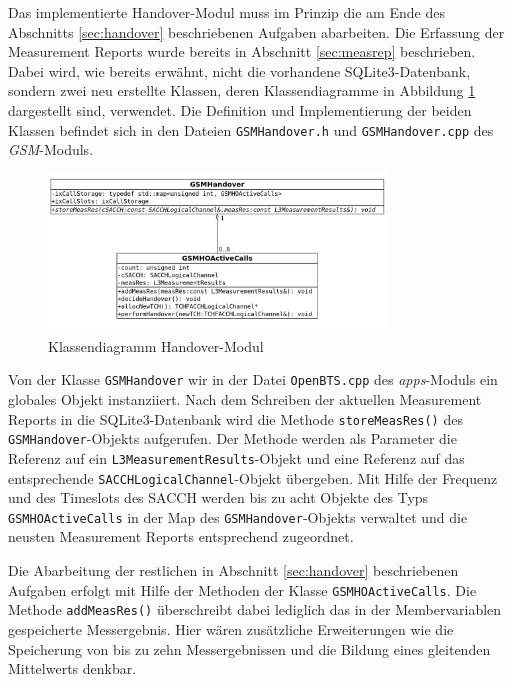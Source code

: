 \label{sec:hom}

Das implementierte Handover-Modul muss im Prinzip die am Ende des Abschnitts \ref{sec:handover} beschriebenen Aufgaben abarbeiten. Die Erfassung der Measurement Reports wurde bereits in Abschnitt \ref{sec:measrep} beschrieben. Dabei wird, wie bereits erwähnt, nicht die vorhandene SQLite3-Datenbank, sondern zwei neu erstellte Klassen, deren Klassendiagramme in Abbildung \ref{fig:homclass} dargestellt sind, verwendet. Die Definition und Implementierung der beiden Klassen befindet sich in den Dateien \lstinline{GSMHandover.h} und \lstinline{GSMHandover.cpp} des \textit{GSM}-Moduls.

\begin{figure}[h!t!b!p!]
  \centering
  \includegraphics[width=0.8\textwidth]{img/homc}
  \caption{Klassendiagramm Handover-Modul}
  \label{fig:homclass}
\end{figure}

Von der Klasse \lstinline{GSMHandover} wir in der Datei \lstinline{OpenBTS.cpp} des \textit{apps}-Moduls ein globales Objekt instanziiert. Nach dem Schreiben der aktuellen Measurement Reports in die SQLite3-Datenbank wird die Methode \lstinline{storeMeasRes()} des \lstinline{GSMHandover}-Objekts aufgerufen. Der Methode werden als Parameter die Referenz auf ein \lstinline{L3MeasurementResults}-Objekt und eine Referenz auf das entsprechende \lstinline{SACCHLogicalChannel}-Objekt übergeben. Mit Hilfe der Frequenz und des Timeslots des SACCH werden bis zu acht Objekte des Typs \lstinline{GSMHOActiveCalls} in der Map des \lstinline{GSMHandover}-Objekts verwaltet und die neusten Measurement Reports entsprechend zugeordnet.

Die Abarbeitung der restlichen in Abschnitt \ref{sec:handover} beschriebenen Aufgaben erfolgt mit Hilfe der Methoden der Klasse \lstinline{GSMHOActiveCalls}. Die Methode \lstinline{addMeasRes()} überschreibt dabei lediglich das in der Membervariablen gespeicherte Messergebnis. Hier wären zusätzliche Erweiterungen wie die Speicherung von bis zu zehn Messergebnissen und die Bildung eines gleitenden Mittelwerts denkbar.

